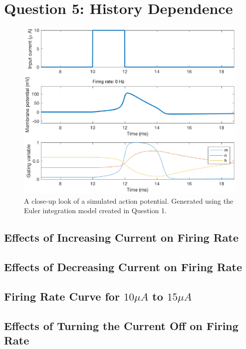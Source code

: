 \documentclass[11pt, oneside]{article}
\begin{document}
\section{Question 5: History Dependence}

\begin{figure}[ht!]
\centering
\includegraphics[width=1\textwidth]{simulate_hh_action_potential.eps}
\caption{A close-up look of a simulated action potential. Generated using the Euler integration model created in Question 1.}
\label{fig:action_potential_close_up}
\end{figure}

\subsection{Effects of Increasing Current on Firing Rate}

\subsection{Effects of Decreasing Current on Firing Rate}

\subsection{Firing Rate Curve for $10\mu A$ to $15\mu A$}

\subsection{Effects of Turning the Current Off on Firing Rate}
\end{document}
